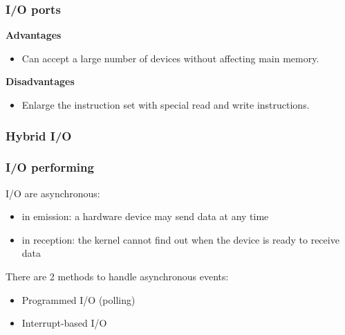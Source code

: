%
%
%

\begin{frame}
  \frametitle{I/O ports}

  \begin{center}
  \end{center}

  {\bf Advantages}\\
  \begin{itemize}
    \item Can accept a large number of devices without affecting main memory.
  \end{itemize}

  {\bf Disadvantages}\\
  \begin{itemize}
    \item Enlarge the instruction set with special read and write instructions.
  \end{itemize}

\end{frame}

%
%
%

\begin{frame}
  \frametitle{Hybrid I/O}

  \begin{center}
  \end{center}

\end{frame}

%
%
%

\begin{frame}
  \frametitle{I/O performing}

  I/O are asynchronous:

  \begin{itemize}
    \item in emission: a hardware device may send data at any time
    \item in reception: the kernel cannot find out when the device is ready to
      receive data
  \end{itemize}

  \nl

  There are 2 methods to handle asynchronous events:

  \begin{itemize}
    \item Programmed I/O (polling)
    \item Interrupt-based I/O
  \end{itemize}

\end{frame}

